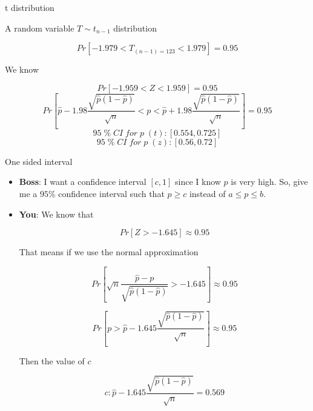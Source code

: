 \documentclass{beamer}\usepackage[]{graphicx}\usepackage[]{color}
\begin{document}
\begin{frame}{t distribution}

A random variable $T \sim t_{n-1}$ distribution

$$ Pr \left [ -1.979 < T_{(n-1)= 123} < 1.979 \right ] = 0.95 $$ \pause

We know 

$$ Pr \left [ -1.959 < Z < 1.959 \right ] = 0.95  $$ \pause
$$ Pr [ \hat{p} - 1.98 \frac{\sqrt{\hat{p}(1-\hat{p})}}{\sqrt{n}} < p < \hat{p} + 1.98 \frac{\sqrt{\hat{p}(1-\hat{p})}}{\sqrt{n}}  ] = 0.95 $$ \pause
$$ 95 \; \%  \; CI \; for \; p \; (t) : \left [ 0.554, 0.725 \right ] $$ \pause
$$ 95 \; \%  \; CI \; for \; p \; (z) : \left [ 0.56, 0.72 \right ] $$

\end{frame}

\begin{frame}{One sided interval}

\begin{itemize}
\item \textbf{Boss}: I want a confidence interval $[c, 1]$ since I know $p$ is very high. So, give me a $95 \%$ confidence interval such that $p \geq c$ instead of $a \leq p \leq b$.  \pause

\item \textbf{You}:  We know that

$$ Pr \left [ Z > -1.645 \right ] \approx 0.95 $$ \pause

That means if we use the normal approximation

$$ Pr \left [  \sqrt{n} \frac{\hat{p} - p}{\sqrt{\hat{p}(1-\hat{p})}} > -1.645 \right ] \approx 0.95 $$ \pause

$$ Pr \left [ p >  \hat{p} - 1.645 \frac{\sqrt{\hat{p}(1-\hat{p})}}{\sqrt{n}} \right] \approx 0.95 $$ \pause

Then the value of $c$

$$ c: \hat{p} - 1.645 \frac{\sqrt{\hat{p}(1-\hat{p})}}{\sqrt{n}} = 0.569 $$ \pause
\end{itemize}

\end{frame}
\end{document}
